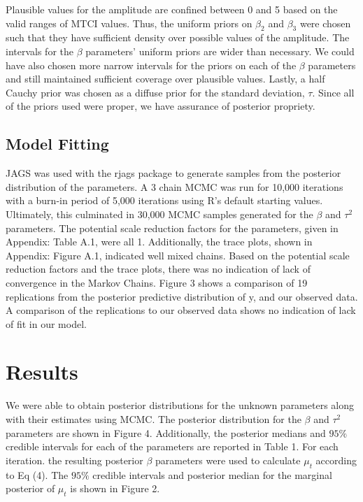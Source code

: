 \documentclass[12pt, a4paper]{article}
\begin{document}
Plausible values for the amplitude are confined between 0 and 5 based on the valid ranges of MTCI values. Thus, the uniform priors on $\beta_{2}$ and $\beta_{3}$ were chosen such that they have sufficient density over possible values of the amplitude. The intervals for the $\beta$ parameters' uniform priors are wider than necessary. We could have also chosen more narrow intervals for the priors on each of the $\beta$ parameters and still maintained sufficient coverage over plausible values. Lastly, a half Cauchy prior was chosen as a diffuse prior for the standard deviation, $\tau$. Since all of the priors used were proper, we have assurance of posterior propriety.

\subsection{Model Fitting}   
\qquad JAGS was used with the rjags package to generate samples from the posterior distribution of the parameters. A 3 chain MCMC was run for 10,000 iterations with a burn-in period of 5,000 iterations using R's default starting values. Ultimately, this culminated in 30,000 MCMC samples generated for the $\beta$ and $\tau^2$ parameters.  The potential scale reduction factors for the parameters, given in Appendix: Table A.1, were all 1. Additionally, the trace plots, shown in Appendix: Figure A.1, indicated well mixed chains. Based on the potential scale reduction factors and the trace plots, there was no indication of lack of convergence in the Markov Chains. Figure 3 shows a comparison of 19 replications from the posterior predictive distribution of y, and our observed data. A comparison of the replications to our observed data shows no indication of lack of fit in our model.
\section{Results}
\qquad We were able to obtain posterior distributions for the unknown parameters along with their estimates using MCMC. The posterior distribution for the $\beta$ and $\tau^2$ parameters are shown in Figure 4. Additionally, the posterior medians and $95\%$ credible intervals for each of the parameters are reported in Table 1. For each iteration. the resulting posterior $\beta$ parameters were used to calculate $\mu_{t}$ according to Eq (4). The $95\%$ credible intervals and posterior median for the marginal posterior of $\mu_{t}$ is shown in Figure 2.
\end{document}
